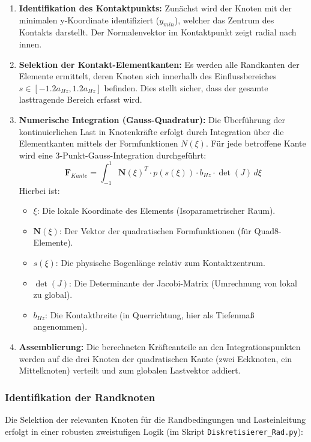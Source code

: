 \begin{enumerate}
    \item \textbf{Identifikation des Kontaktpunkts:} 
    Zunächst wird der Knoten mit der minimalen y-Koordinate identifiziert ($y_{min}$), welcher das Zentrum des Kontakts darstellt. Der Normalenvektor im Kontaktpunkt zeigt radial nach innen.

    \item \textbf{Selektion der Kontakt-Elementkanten:} 
    Es werden alle Randkanten der Elemente ermittelt, deren Knoten sich innerhalb des Einflussbereiches $s \in [-1.2 a_{Hz}, 1.2 a_{Hz}]$ befinden. Dies stellt sicher, dass der gesamte lasttragende Bereich erfasst wird.

    \item \textbf{Numerische Integration (Gauss-Quadratur):} 
    Die Überführung der kontinuierlichen Last in Knotenkräfte erfolgt durch Integration über die Elementkanten mittels der Formfunktionen $N(\xi)$. Für jede betroffene Kante wird eine 3-Punkt-Gauss-Integration durchgeführt:
    \begin{equation}
        \mathbf{F}_{Kante} = \int_{-1}^{1} \mathbf{N}(\xi)^T \cdot p(s(\xi)) \cdot b_{Hz} \cdot \det(J) \, d\xi
    \end{equation}
    Hierbei ist:
    \begin{itemize}
        \item $\xi$: Die lokale Koordinate des Elements (Isoparametrischer Raum).
        \item $\mathbf{N}(\xi)$: Der Vektor der quadratischen Formfunktionen (für Quad8-Elemente).
        \item $s(\xi)$: Die physische Bogenlänge relativ zum Kontaktzentrum.
        \item $\det(J)$: Die Determinante der Jacobi-Matrix (Umrechnung von lokal zu global).
        \item $b_{Hz}$: Die Kontaktbreite (in Querrichtung, hier als Tiefenmaß angenommen).
    \end{itemize}

    \item \textbf{Assemblierung:} 
    Die berechneten Kräfteanteile an den Integrationspunkten werden auf die drei Knoten der quadratischen Kante (zwei Eckknoten, ein Mittelknoten) verteilt und zum globalen Lastvektor addiert.
\end{enumerate}

\subsubsection{Identifikation der Randknoten}
Die Selektion der relevanten Knoten für die Randbedingungen und Lasteinleitung erfolgt in einer robusten zweistufigen Logik (im Skript \texttt{Diskretisierer\_Rad.py}):

